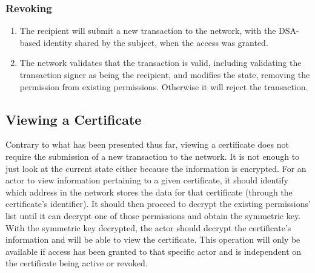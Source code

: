 \subsubsection{Revoking}

\begin{enumerate}
    \item The recipient will submit a new transaction to the network, with the DSA-based identity shared by the subject, when the access was granted.
    \item The network validates that the transaction is valid, including validating the transaction signer as being the recipient, and modifies the state, removing the permission from existing permissions. Otherwise it will reject the transaction.
\end{enumerate}

\subsection{Viewing a Certificate}

Contrary to what has been presented thus far, viewing a certificate does not require the submission of a new transaction to the network. It is not enough to just look at the current state either because the information is encrypted. For an actor to view information pertaining to a given certificate, it should identify which address in the network stores the data for that certificate (through the certificate's identifier). It should then proceed to decrypt the existing permissions' list until it can decrypt one of those permissions and obtain the symmetric key. With the symmetric key decrypted, the actor should decrypt the certificate's information and will be able to view the certificate. This operation will only be available if access has been granted to that specific actor and is independent on the certificate being active or revoked.